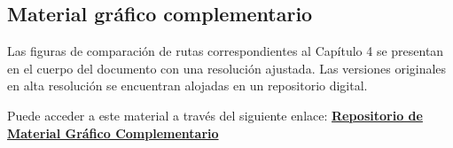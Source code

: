 
\subsection*{Material gráfico complementario} 
Las figuras de comparación de rutas correspondientes al Capítulo 4 se presentan en el cuerpo del documento con una resolución ajustada. Las versiones originales en alta resolución se encuentran alojadas en un repositorio digital.

Puede acceder a este material a través del siguiente enlace: \href{https://drive.google.com/drive/folders/1To0hSq6JNbGpOdTNMWV4x9MXLiccRwF7?usp=sharing}{\textbf{Repositorio de Material Gráfico Complementario}}